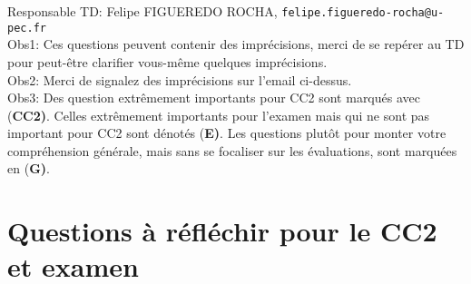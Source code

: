 \documentclass[french,12pt]{article}
\begin{document}
Responsable TD: Felipe FIGUEREDO ROCHA, \texttt{felipe.figueredo-rocha@u-pec.fr} \\
Obs1: Ces questions peuvent contenir des imprécisions, merci de se repérer au TD pour peut-être clarifier vous-même quelques imprécisions. \\
Obs2: Merci de signalez des imprécisions sur l'email ci-dessus. \\ 
Obs3: Des question extrêmement importants pour CC2 sont marqués avec {(\bf CC2)}. Celles extrêmement importants pour l'examen mais qui ne sont pas important pour CC2 sont dénotés {(\bf E)}. Les questions plutôt pour monter votre compréhension générale, mais sans se focaliser sur les évaluations, sont marquées en {(\bf G)}.
\section*{Questions à réfléchir pour le CC2 et examen}
\end{document}

